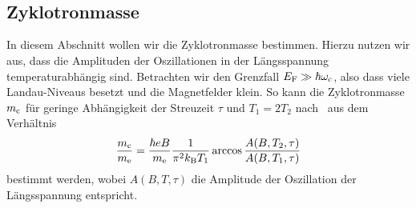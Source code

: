 \documentclass[paper=a4,fontsize=10pt,DIV=18,twocolumn,parskip=half]{scrartcl}
\numberwithin{equation}{section}    %
\begin{document}
%
~~~~~~~~~~~~~~~~~~~~~~~~~~~~~~~~~~~~~~~~~~~~~~~~~~~~~~~~~~~~~~~~~~~~~~~~~~~~~
\subsection{Zyklotronmasse}
\label{a4}

In diesem Abschnitt wollen wir die Zyklotronmasse bestimmen. Hierzu nutzen wir aus, dass die Amplituden der Oszillationen in der Längsspannung temperaturabhängig sind. Betrachten wir den Grenzfall $E_{\rm F} \gg \hbar\omega_{\rm c}$, also dass viele Landau-Niveaus besetzt und die Magnetfelder klein. So kann die Zyklotronmasse $m_{\rm c}$ für geringe Abhängigkeit der Streuzeit $\tau$ und $T_{1} = 2T_{2}$ nach~\citet{ando} aus dem Verhältnis
\begin{equation}
	\frac{m_{\rm c}}{m_{\rm e}} = \frac{\hbar e B}{m_{\rm e}} \frac{1}{\pi^2 k_{\rm B} T_{1}}\arccos\frac{A(B,T_2,\tau)}{A(B,T_1,\tau)}
\end{equation}
bestimmt werden, wobei $A(B,T,\tau)$ die Amplitude der Oszillation der Längsspannung entspricht.
\end{document}
